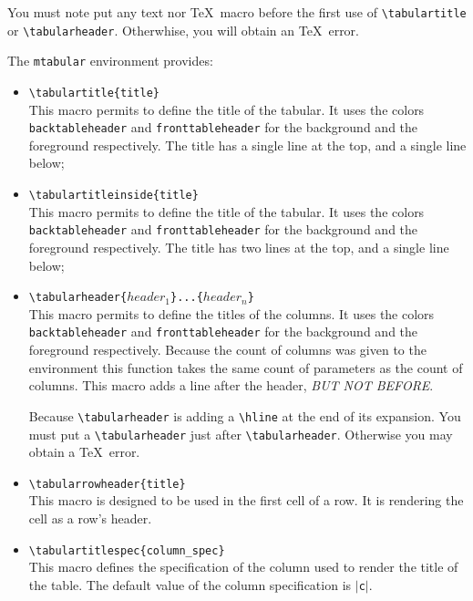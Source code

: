 \documentclass[book]{upmethodology-document}
\begin{document}
\begin{upmcaution}
	You must note put any text nor \TeX\ macro before the first use of \texttt{{\textbackslash}tabulartitle} or \texttt{{\textbackslash}tabularheader}. Otherwhise, you will obtain an \TeX\ error.
\end{upmcaution}


The \texttt{mtabular} environment provides:
\begin{itemize}
\item \texttt{{\textbackslash}tabulartitle\{title\}} \\
	This macro permits to define the title of the tabular. It uses the colors \texttt{backtableheader} and \texttt{fronttableheader} for the background and the foreground respectively. The title has a single line at the top, and a single line below;

\item \texttt{{\textbackslash}tabulartitleinside\{title\}} \\
	This macro permits to define the title of the tabular. It uses the colors \texttt{backtableheader} and \texttt{fronttableheader} for the background and the foreground respectively. The title has two lines at the top, and a single line below;

\item \texttt{{\textbackslash}tabularheader\{$header_1$\}...\{$header_n$\}} \\
	This macro permits to define the titles of the columns. It uses the colors \texttt{backtableheader} and \texttt{fronttableheader} for the background and the foreground respectively. Because the count of columns was given to the environment this function takes the same count of parameters as the count of columns. This macro adds a line after the header, \emph{BUT NOT BEFORE}.
\begin{upmcaution}
	Because \texttt{{\textbackslash}tabularheader} is adding a \texttt{{\textbackslash}hline} at the end of its expansion. You must put a \texttt{{\textbackslash}tabularheader} just after \texttt{{\textbackslash}tabularheader}. Otherwise you may obtain a \TeX\ error.
\end{upmcaution}

\item \texttt{{\textbackslash}tabularrowheader\{title\}} \\
	This macro is designed to be used in the first cell of a row. It is rendering the cell as a row's header.

\item \texttt{{\textbackslash}tabulartitlespec\{column\_spec\}} \\
	This macro defines the specification of the column used to render the title of the table.
	The default value of the column specification is $|$\texttt{c}$|$.

\end{itemize}
\end{document}
